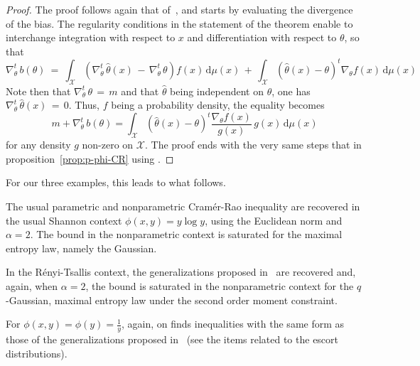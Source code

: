 \documentclass[entropy,article,submit,moreauthors,pdftex]{Definitions/mdpi}
\newcounter{GaussExample}%
\newcounter{qGaussExample}%
\newcounter{arcsineExample}%
\newcommand{\SZ}[1]{{\color{blue} #1}}                                       %
\def\dmu{\mathrm{d}\mu}%
\def\X{\mathcal{X}}%
\begin{document}
\begin{proof}
  The proof  follows again  that of~\cite{Ber13}, and  starts by  evaluating the
  divergence of  the bias.  The  regularity conditions  in the statement  of the
  theorem  enable   to  interchange   integration  with   respect  to   $x$  and
  differentiation with respect to $\theta$, so that
  \[
  \nabla_\theta^t  \,  b(\theta)  \:  = \:  \int_\X  \left(  \nabla_\theta^t  \,
  \widehat{\theta}(x) \, - \, \nabla_\theta^t  \, \theta \right) f(x) \, \dmu(x)
  \, +  \, \int_\X \left(  \widehat{\theta}(x) - \theta  \right)^t \nabla_\theta
  f(x) \, \dmu(x)
  \]
  Note   then  that   $\nabla_\theta^t  \,   \theta  \,   =  \,   m$  and   that
  $\widehat{\theta}$ being independent on  $\theta$, one has $\nabla_\theta^t \,
  \widehat{\theta}(x) \,  = \, 0$.  Thus, $f$  being a probability  density, the
  equality becomes
  \[
  m + \nabla_\theta^t \, b(\theta) = \int_\X \left( \widehat{\theta}(x) - \theta
  \right)^t \frac{\nabla_\theta f(x)}{g(x)} \, g(x) \, \dmu(x)
  \]
  for any density $g$ non-zero on $\X$.  The proof ends with the very same steps
  that in proposition~\ref{prop:p-phi-CR} using \cite[Lemma~2]{Ber13}.
\end{proof}

%
For our three examples, this leads to what follows.
%
\begin{Example}
  The usual  parametric and nonparametric Cram\'er-Rao  inequality are recovered
  in the usual Shannon context $\phi(x,y) =  y \log y$, using the Euclidean norm
  and $\alpha = 2$. The bound in  the nonparametric context is saturated for the
  maximal entropy law, namely the Gaussian.
\end{Example}
%
\begin{Example}
  In    the    R\'enyi-Tsallis    context,    the    generalizations    proposed
  in~\cite{Ber12:06_1, Ber12:06_2, Ber13} are recovered and, again, when $\alpha
  =  2$,  the   bound  is  saturated  in  the  nonparametric   context  for  the
  $q$-Gaussian, maximal entropy law under the second order moment constraint.
\end{Example}
%
\begin{Example}
  For $\phi(x,y) = \phi(y) = \frac{1}{y}$, again, \SZ{on finds inequalities with
    the same form as those of} the generalizations proposed in~\cite{Ber12:06_1,
    Ber12:06_2, Ber13} (see the items related to the escort distributions).
\end{Example}
\end{document}
